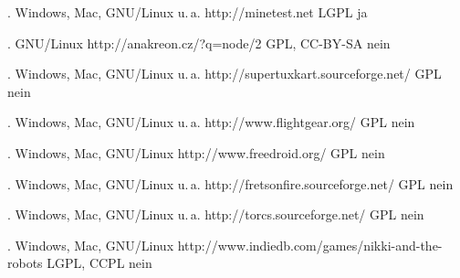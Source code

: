 



{.}
{Windows, Mac, GNU/Linux u.\,a.}
{http://minetest.net}
{LGPL}
{ja}

{.}
{GNU/Linux} %
{http://anakreon.cz/?q=node/2}
{GPL, CC-BY-SA}
{nein}

{.}
{Windows, Mac, GNU/Linux u.\,a.}
{http://supertuxkart.sourceforge.net/}
{GPL}
{nein} %


{.}
{Windows, Mac, GNU/Linux u.\,a.}
{http://www.flightgear.org/}
{GPL}
{nein} %


{.}
{Windows, Mac, GNU/Linux}
{http://www.freedroid.org/}
{GPL}
{nein}

{.}
{Windows, Mac, GNU/Linux u.\,a.}
{http://fretsonfire.sourceforge.net/}
{GPL}
{nein} %

{.}
{Windows, Mac, GNU/Linux u.\,a.}
{http://torcs.sourceforge.net/}
{GPL}
{nein} %

{.}
{Windows, Mac, GNU/Linux}
{http://www.indiedb.com/games/nikki-and-the-robots}
{LGPL, CCPL}
{nein}

\backpage


